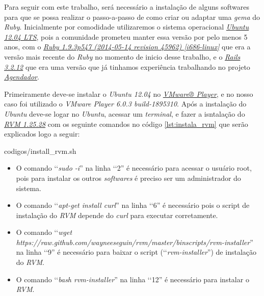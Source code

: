 Para seguir com este trabalho, será necessário a instalação de alguns softwares para que se possa realizar
o passo-a-passo de como criar ou adaptar uma \emph{gema} do \emph{Ruby}.
Inicialmente por comodidade utilizaremos o sistema operacional 
\emph{\href{http://releases.ubuntu.com/12.04/}{Ubuntu 12.04 LTS}}, pois a comunidade prometeu manter essa 
versão por pelo menos 5 anos, com o 
\emph{\href{https://www.ruby-lang.org/en/downloads/}{Ruby 1.9.3p547 (2014-05-14 revision 45962) [i686-linux]}} 
que era a versão mais recente do \emph{Ruby} no momento de inicio desse trabalho, e o 
\emph{\href{http://rubyonrails.org/download/}{Rails 3.2.12}} que era uma versão que já tinhamos experiência
trabalhando no projeto \emph{\href{http://agendador.c3sl.ufpr.br/}{Agendador}}.

Primeiramente deve-se instalar o \emph{Ubuntu 12.04} no 
\emph{\href{https://my.vmware.com/web/vmware/free\#desktop_end_user_computing/vmware_player/}{VMware® Player}}, 
e no nosso caso foi utilizado o \emph{VMware Player 6.0.3 build-1895310}. Após a instalação do \emph{Ubuntu}
deve-se logar no \emph{Ubuntu}, acessar um \emph{terminal}, e fazer a isntalação do 
\emph{\href{https://github.com/wayneeseguin/rvm}{RVM 1.25.28}} com os seguinte comandos no código 
\ref{lst:instala_rvm} que serão explicados logo a seguir:
 
 
 {codigos/install_rvm.sh}
 
\begin{itemize}

\item O comando ‘‘\emph{sudo -i}'' na linha ‘‘2'' é necessário para acessar o usuário root, pois 
  para instalar os outros \emph{softwares} é preciso ser um administrador do sistema.
  
  \item O comando ‘‘\emph{apt-get install curl}'' na linha ‘‘6'' é necessário pois o script de 
  instalação do \emph{RVM} depende do \emph{curl} para executar corretamente.
  
  \item O comando ‘‘\emph{wget https://raw.github.com/wayneeseguin/rvm/master/binscripts/rvm-installer}'' 
  na linha ‘‘9'' é necessário para baixar o script (‘‘\emph{rvm-installer}'') de instalação do \emph{RVM}.
  
  \item O comando ‘‘\emph{bash rvm-installer}'' na linha ‘‘12'' é necessário para instalar o \emph{RVM}.
  
\end{itemize}

